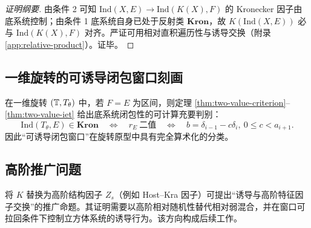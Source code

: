 \begin{proof}[证明纲要]
由条件 2 可知 $\mathrm{Ind}(X,E)\to \mathrm{Ind}(K(X),F)$ 的 Kronecker 因子由底系统控制；由条件 1 底系统自身已处于反射类 $\mathbf{Kron}$，故 $K(\mathrm{Ind}(X,E))$ 必与 $\mathrm{Ind}(K(X),F)$ 对齐。严证可用相对直积遍历性与诱导交换（附录 \ref{app:relative-product}）。证毕。
\end{proof}

\subsection{一维旋转的可诱导闭包窗口刻画}

在一维旋转 $(\mathbb{T},T_\theta)$ 中，若 $F=E$ 为区间，则定理 \ref{thm:two-value-criterion}--\ref{thm:two-value-iet} 给出底系统闭包性的可计算充要判别：
\[
\mathrm{Ind}(T_\theta,E)\in\mathbf{Kron}
\quad\Longleftrightarrow\quad
r_E\ \text{二值}
\quad\Longleftrightarrow\quad
b=\delta_{i-1}-c\delta_i,\ 0\le c<a_{i+1}.
\]
因此“可诱导闭包窗口”在旋转原型中具有完全算术化的分类。

\subsection{高阶推广问题}

将 $K$ 替换为高阶结构因子 $Z_s$（例如 Host--Kra 因子）可提出“诱导与高阶特征因子交换”的推广命题。其证明需要以高阶相对随机性替代相对弱混合，并在窗口可拉回条件下控制立方体系统的诱导行为。该方向构成后续工作。

